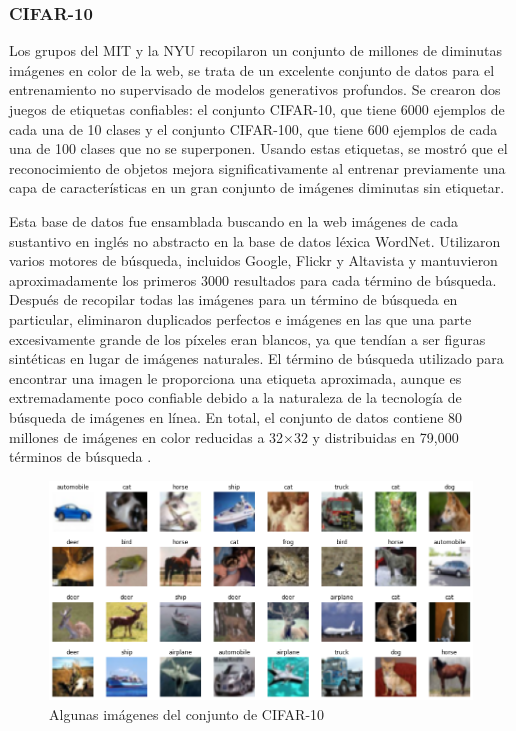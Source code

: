 \subsubsection{CIFAR-10}
Los grupos del MIT y la NYU recopilaron un conjunto de millones de diminutas imágenes en color de la web, se trata de un excelente conjunto de datos para el entrenamiento no supervisado de modelos generativos profundos. Se crearon dos juegos de etiquetas confiables: el conjunto CIFAR-10, que tiene 6000 ejemplos de cada una de 10 clases y el conjunto CIFAR-100, que tiene 600 ejemplos de cada una de 100 clases que no se superponen. Usando estas etiquetas, se mostró que el reconocimiento de objetos mejora significativamente al entrenar previamente una capa de características en un gran conjunto de imágenes diminutas sin etiquetar.

Esta base de datos fue ensamblada buscando en la web imágenes de cada sustantivo en inglés no abstracto en la base de datos léxica WordNet. Utilizaron varios motores de búsqueda, incluidos Google, Flickr y Altavista y mantuvieron aproximadamente los primeros 3000 resultados para cada término de búsqueda. Después de recopilar todas las imágenes para un término de búsqueda en particular, eliminaron duplicados perfectos e imágenes en las que una parte excesivamente grande de los píxeles eran blancos, ya que tendían a ser figuras sintéticas en lugar de imágenes naturales. El término de búsqueda utilizado para encontrar una imagen le proporciona una etiqueta aproximada, aunque es extremadamente poco confiable debido a la naturaleza de la tecnología de búsqueda de imágenes en línea. En total, el conjunto de datos contiene 80 millones de imágenes en color reducidas a 32×32 y distribuidas en 79,000 términos de búsqueda \cite{Krizhevsky09learningmultiple}.

\begin{figure}[h!]
    \centering
    \includegraphics[width=\textwidth]{images/cifar10example.png}
    \caption{Algunas imágenes del conjunto de CIFAR-10 \cite{Krizhevsky09learningmultiple}}
    \label{cifar}
\end{figure}

